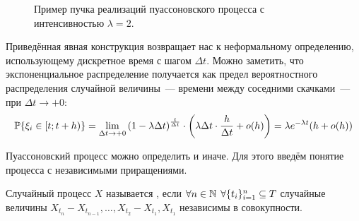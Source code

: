 \begin{figure}[ht!]
    \centering
    \caption{Пример пучка реализаций пуассоновского процесса с интенсивностью $ \lambda = 2 $.}
    \label{figure:special:Poisson_proccess_realizations}
\end{figure}


Приведённая явная конструкция возвращает нас к неформальному определению,
использующему дискретное время с шагом $ \Delta t $.
Можно заметить, что экспоненциальное распределение получается как
предел вероятностного распределения случайной величины~---
времени между соседними скачками~--- при $ \Delta t \to +0 $:
\[
    \mathbb{P} \{ \xi_i \in [t; t+h) \} = \lim_{\Delta t \to +0} \left( 1 - \lambda \Delta t \right)^{\frac{t}{\Delta t}} \cdot \left( \lambda \Delta t \cdot \frac{h}{\Delta t} + o(h) \right) =
    \lambda e^{-\lambda t} (h + o(h))
\]

Пуассоновский процесс можно определить и иначе.
Для этого введём понятие процесса с независимыми приращениями.

\begin{definition}
    \label{definition:special:independent_deltas}
    Случайный процесс $ X $ называется ,
    если $ \forall n \in \mathbb{N} \;\, \forall \{t_i\}_{i=1}^n \subseteq T $ случайные величины
    $ X_{t_n} - X_{t_{n-1}}, \ldots, X_{t_2} - X_{t_1}, X_{t_1} $
    независимы в совокупности.
\end{definition}

